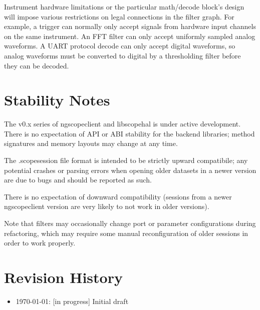 Instrument hardware limitations or the particular math/decode block's design will impose various restrictions on legal
connections in the filter graph. For example, a trigger can normally only accept signals from hardware input channels
on the same instrument. An FFT filter can only accept uniformly sampled analog waveforms. A UART protocol decode can
only accept digital waveforms, so analog waveforms must be converted to digital by a thresholding filter before they
can be decoded.

\section{Stability Notes}

The v0.x series of ngscopeclient and libscopehal is under active development. There is no expectation of API or ABI
stability for the backend libraries; method signatures and memory layouts may change at any time.

The .scopesession file format is intended to be strictly upward compatibile; any potential crashes or parsing errors
when opening older datasets in a newer version are due to bugs and should be reported as such.

There is no expectation of downward compatibility (sessions from a newer ngscopeclient version are very likely to not
work in older versions).

Note that filters may occasionally change port or parameter configurations during refactoring, which may require some
manual reconfiguration of older sessions in order to work properly.

\section{Revision History}
\begin{itemize}
\item \today: [in progress] Initial draft
\end{itemize}
